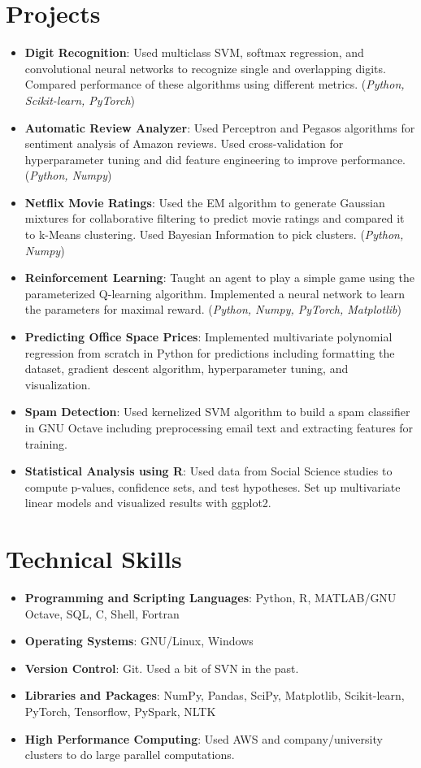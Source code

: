 \documentclass[letterpaper,11pt]{article}
\newcommand{\resumeItem}[2]{
	\item\small{
		\textbf{#1}{: #2 \vspace{-2pt}}
	}
}
\newcommand{\resumeSubItem}[2]{\resumeItem{#1}{#2}\vspace{-4pt}}
\newcommand{\resumeSubHeadingListStart}{\begin{itemize}[leftmargin=*]}
\newcommand{\resumeSubHeadingListEnd}{\end{itemize}}
\begin{document}
	\section{Projects}
	\resumeSubHeadingListStart
	\resumeSubItem{Digit Recognition}
	{Used multiclass SVM, softmax regression, and convolutional neural networks to recognize single and overlapping digits. Compared performance of these algorithms using different metrics. (\textit{\small Python, Scikit-learn, PyTorch})}
	\resumeSubItem{Automatic Review Analyzer}
	{Used Perceptron and Pegasos algorithms for sentiment analysis of Amazon reviews. Used cross-validation for hyperparameter tuning and did feature engineering to improve performance. (\textit{\small Python, Numpy})}
	\resumeSubItem{Netflix Movie Ratings}
	{Used the EM algorithm to generate Gaussian mixtures for collaborative filtering to predict movie ratings and compared it to k-Means clustering. Used Bayesian Information to pick clusters. (\textit{\small Python, Numpy})}
	\resumeSubItem{Reinforcement Learning}
	{Taught an agent to play a simple game using the parameterized Q-learning algorithm. Implemented a neural network to learn the parameters for maximal reward. (\textit{\small Python, Numpy, PyTorch, Matplotlib})}
	\resumeSubItem{Predicting Office Space Prices}
	{Implemented multivariate polynomial regression from scratch in Python for predictions including formatting the dataset, gradient descent algorithm, hyperparameter tuning, and visualization.}
	\resumeSubItem{Spam Detection}
	{Used kernelized SVM algorithm to build a spam classifier in GNU Octave including preprocessing email text and extracting features for training.}
	\resumeSubItem{Statistical Analysis using R}
	{Used data from Social Science studies to compute p-values, confidence sets, and test hypotheses. Set up multivariate linear models and visualized results with ggplot2.}
	\resumeSubHeadingListEnd
	
	\section{Technical Skills}
	\resumeSubHeadingListStart
	\resumeSubItem{Programming and Scripting Languages}
	{Python, R, MATLAB/GNU Octave, SQL, C, Shell, Fortran}
	\resumeSubItem{Operating Systems}
	{GNU/Linux, Windows}
	\resumeSubItem{Version Control}
	{Git. Used a bit of SVN in the past.}
	\resumeSubItem{Libraries and Packages}
	{NumPy, Pandas, SciPy, Matplotlib, Scikit-learn, PyTorch, Tensorflow, PySpark, NLTK}
	\resumeSubItem{High Performance Computing}
	{Used AWS and company/university clusters to do large parallel computations.}
	\resumeSubHeadingListEnd
	
\end{document}
